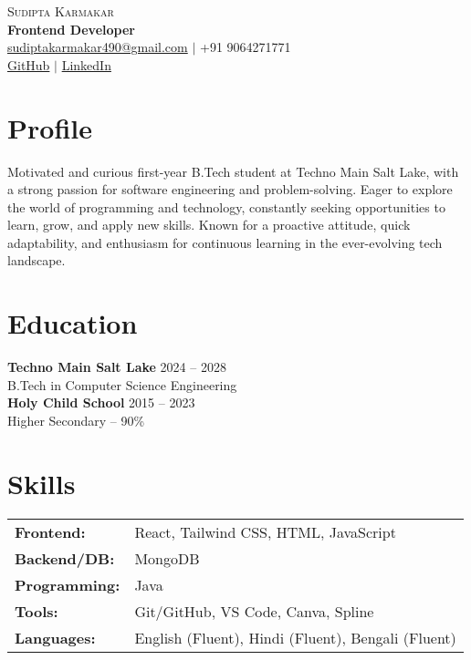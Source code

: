 \documentclass[a4paper,11pt]{article}
\begin{document}
\begin{center}
    {\Huge \scshape Sudipta Karmakar} \\ \vspace{2pt}
    \textbf{Frontend Developer} \\
    \vspace{5pt}
    \href{mailto:sudiptakarmakar490@gmail.com}{sudiptakarmakar490@gmail.com} $|$ +91 9064271771 \\
    \vspace{5pt}
    \href{https://github.com/}{GitHub} $|$ \href{https://linkedin.com/}{LinkedIn} 
\end{center}

\section{Profile}
Motivated and curious first-year B.Tech student at Techno Main Salt Lake, with a strong passion for software engineering and problem-solving. Eager to explore the world of programming and technology, constantly seeking opportunities to learn, grow, and apply new skills. Known for a proactive attitude, quick adaptability, and enthusiasm for continuous learning in the ever-evolving tech landscape.

\section{Education}
\textbf{Techno Main Salt Lake} \hfill 2024 -- 2028 \\
B.Tech in Computer Science Engineering \\

\textbf{Holy Child School} \hfill 2015 -- 2023 \\
Higher Secondary -- 90\% 

\section{Skills}
\begin{tabular}{ l l }
\textbf{Frontend:} & React, Tailwind CSS, HTML, JavaScript \\
\textbf{Backend/DB:} & MongoDB \\
\textbf{Programming:} & Java \\
\textbf{Tools:} & Git/GitHub, VS Code, Canva, Spline \\
\textbf{Languages:} & English (Fluent), Hindi (Fluent), Bengali (Fluent)
\end{tabular}
\end{document}

